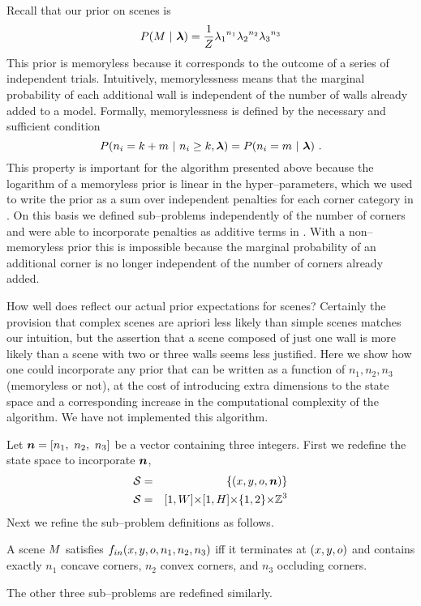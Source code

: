 Recall that our prior on scenes  is
\begin{equation}
  \label{eq:scene-prior-2}
  P(\Scene ~|~ \Penalties) = \frac{1}{Z} 
    {\PenaltyConc}^{n_1} {\PenaltyConv}^{n_2} {\PenaltyOccl}^{n_3}
\end{equation}
This prior is memoryless because it corresponds to the outcome of a
series of independent trials. Intuitively, memorylessness means that
the marginal probability of each additional wall is independent of the
number of walls already added to a model. Formally, memorylessness is
defined by the necessary and sufficient condition
\begin{equation}
  P(n_i = k+m ~|~ n_i \geq k, \Penalties) = P(n_i = m ~|~ \Penalties) ~.
\end{equation}
This property is important for the algorithm presented above because
the logarithm of a memoryless prior is linear in the
hyper--parameters, which we used to write the prior as a sum over
independent penalties for each corner category in
. On this basis we defined sub--problems
independently of the number of corners and were able to incorporate
penalties as additive terms in . With a
non--memoryless prior this is impossible because the marginal
probability of an additional corner is no longer independent of the
number of corners already added.

How well does  reflect our actual prior
expectations for scenes? Certainly the provision that complex scenes
are apriori less likely than simple scenes matches our intuition, but
the assertion that a scene composed of just one wall is more likely
than a scene with two or three walls seems less justified. Here we
show how one could incorporate any prior that can be written as a
function of $n_1,n_2,n_3$ (memoryless or not), at the cost of
introducing extra dimensions to the state space and a corresponding
increase in the computational complexity of the algorithm. We have not
implemented this algorithm.

Let $\Counts=[n_1,~n_2,~n_3]$ be a vector containing three
integers. First we redefine the state space to incorporate $\Counts$,
\begin{eqnarray}
  \StateSpace &=& \{(x,y,\WallOrient,\Counts)\}\\
  \StateSpace &=& [1,\Width] \cross [1,\Height] \cross \{1,2\} \cross \Ints^3
\end{eqnarray}
Next we refine the sub--problem definitions as follows. 
\begin{definition}
  A scene $\Scene$ satisfies $\SubProbIN(x,y,\WallOrient,n_1,n_2,n_3)$
  iff it terminates at $(x,y,\WallOrient)$ and contains exactly $n_1$
  concave corners, $n_2$ convex corners, and $n_3$ occluding
  corners.
\end{definition}
The other three sub--problems are redefined similarly.

